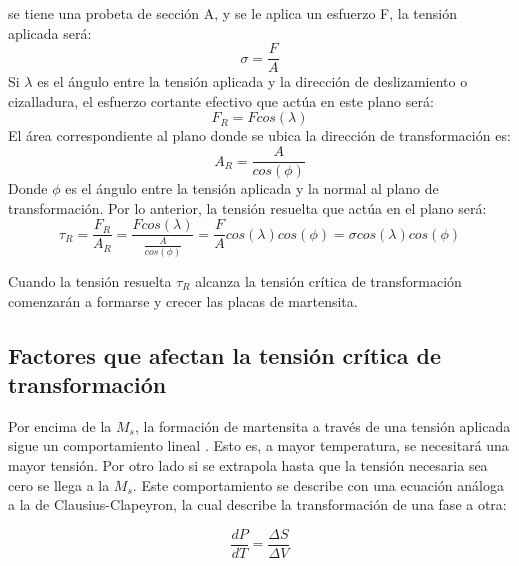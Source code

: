 \documentclass[a4paper,12pt,fleqn,twoside,openany]{book}
\begin{document}
 se tiene una probeta de 
sección A, y se le aplica un esfuerzo F, la tensión aplicada será:
\begin{equation}
 \sigma = \frac{F}{A}
\end{equation}
Si $\lambda$ es el ángulo entre la tensión aplicada y la dirección de deslizamiento o cizalladura, el esfuerzo cortante efectivo que actúa en este plano será:
\begin{equation}
 F_{R}= F cos(\lambda)
\end{equation}
El área correspondiente al plano donde se ubica la dirección de transformación es:
\begin{equation}
 A_{R}=\frac{A}{cos(\phi)}
\end{equation}
Donde $\phi$ es el ángulo entre la tensión aplicada y la normal al plano de transformación. Por lo anterior, la tensión resuelta que actúa en el plano será:
\begin{equation}
 \tau_{R}=\frac{F_{R}}{A_{R}}= \frac{Fcos(\lambda) }{\frac{A}{cos(\phi)}}=\frac{F}{A} cos(\lambda)cos(\phi) = \sigma cos(\lambda)cos(\phi)
\end{equation}

Cuando la tensión resuelta $\tau_R$ alcanza la tensión crítica de transformación comenzarán a formarse y crecer las placas de martensita.


\subsection{Factores que afectan la tensión crítica de transformación}


Por encima de la $M_s$, la formación de martensita a través de una tensión aplicada sigue un comportamiento lineal \cite{pierre}. Esto es, a mayor temperatura, se 
necesitará una mayor tensión. Por otro lado si se extrapola hasta que la tensión necesaria sea cero se llega a la $M_s$. Este comportamiento se describe con una ecuación 
análoga a la de Clausius-Clapeyron, la cual describe la transformación de una fase a otra:

\begin{equation}
 \frac{dP}{dT}=\frac{\Delta S}{\Delta V}
\end{equation}
\end{document}

